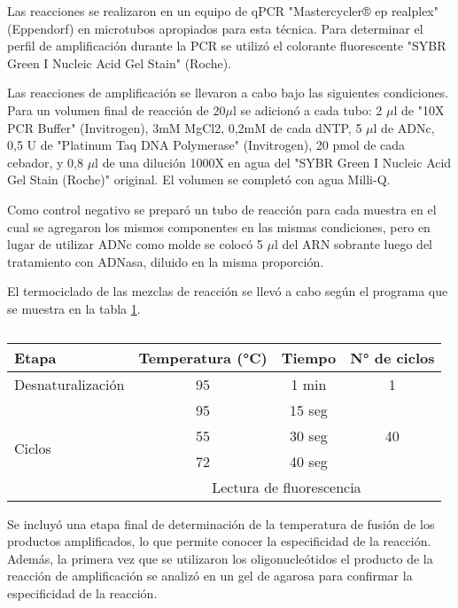 Las reacciones se realizaron en un equipo de qPCR "Mastercycler® ep realplex" (Eppendorf) en microtubos apropiados para esta técnica. 
Para determinar el perfil de amplificación durante la PCR se utilizó el colorante fluorescente "SYBR Green I Nucleic Acid Gel Stain" (Roche).

Las reacciones de amplificación se llevaron a cabo bajo las siguientes condiciones.
Para un volumen final de reacción de 20$\mu$l se adicionó a cada tubo: 2 $\mu$l de "10X PCR Buffer" (Invitrogen), 3mM MgCl2, 0,2mM de cada dNTP, 5 $\mu$l de ADNc, 0,5 U de "Platinum Taq DNA Polymerase" (Invitrogen), 20 pmol de cada cebador, y 0,8 $\mu$l de una dilución 1000X en agua del "SYBR Green I Nucleic Acid Gel Stain (Roche)" original.
El volumen se completó con agua Milli-Q.

Como control negativo se preparó un tubo de reacción para cada muestra en el cual se agregaron los mismos componentes en las mismas condiciones, pero en lugar de utilizar ADNc como molde se colocó 5 $\mu$l del ARN sobrante luego del tratamiento con ADNasa, diluido en la misma proporción.

El termociclado de las mezclas de reacción se llevó a cabo según el programa que se muestra en la tabla \ref{table:termociclado}.


\begin{table}[!htbp]
\centering
\small
\caption{}
\label{table:termociclado}
\begin{tabular}{|l|c|c|c|}
\hline
Etapa                   & Temperatura (°C) & Tiempo & N° de ciclos        \\ \hline
Desnaturalización       & 95               & 1 min  & 1                   \\ \hline
\multirow{4}{*}{Ciclos} & 95               & 15 seg & \multirow{3}{*}{40} \\ \cline{2-3}
                        & 55               & 30 seg &                     \\ \cline{2-3}
                        & 72               & 40 seg &                     \\ \cline{2-4} 
                        & \multicolumn{3}{c|}{Lectura de fluorescencia}   \\ \hline
\end{tabular}
\end{table}

Se incluyó una etapa final de determinación de la temperatura de fusión de los productos amplificados, lo que permite conocer la especificidad de la reacción. 
Además, la primera vez que se utilizaron los oligonucleótidos el producto de la reacción de amplificación se analizó en un gel de agarosa para confirmar la especificidad de la reacción.

